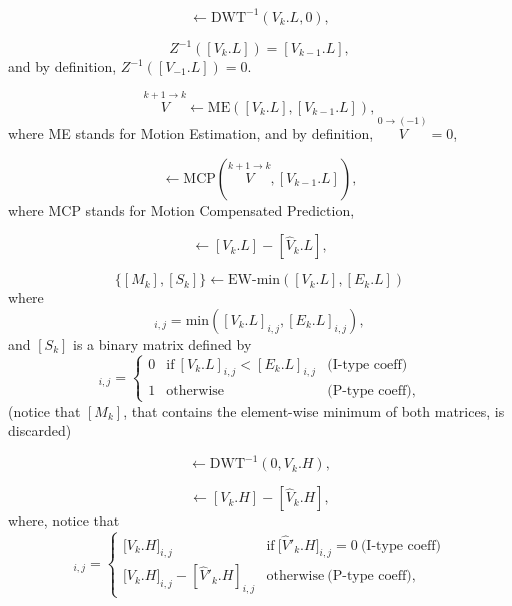 \begin{equation}
  [V_k.L] \leftarrow \text{DWT}^{-1}(V_k.L, 0),
  \tag{E.a}
\end{equation}

\begin{equation}
  Z^{-1}([V_k.L]) = [V_{k-1}.L],
  \tag{E.b}
\end{equation}
and by definition, $Z^{-1}([V_{-1}.L]) = 0$.

\begin{equation}
  \overset{k+1\rightarrow k}{V} \leftarrow \text{ME}([V_k.L], [V_{k-1}.L]),
  \tag{E.c}
\end{equation}
where ME stands for Motion Estimation, and by definition,
$\overset{0\rightarrow (-1)}{V}=0$,

\begin{equation}
  [\hat{V}_k.L] \leftarrow \text{MCP}(\overset{k+1\rightarrow k}{V}, [V_{k-1}.L]),
  \tag{E.d}
\end{equation}
where MCP stands for Motion Compensated Prediction,

\begin{equation}
  [E_k.L] \leftarrow [V_k.L] - [\hat{V}_k.L],
  \tag{E.e}
\end{equation}

\begin{equation}
  \{[M_k],[S_k]\} \leftarrow \text{EW-min}([V_k.L], [E_k.L])
  \tag{E.f}
\end{equation}
where
\begin{equation}
  [M_k]_{i,j}=\text{min}([V_k.L]_{i,j}, [E_k.L]_{i,j}),
\end{equation}
and $[S_k]$ is a binary matrix defined by
\begin{equation}
  [S_k]_{i,j} = \left\{
  \begin{array}{lll}
    0 & \text{if}~[V_k.L]_{i,j} < [E_k.L]_{i,j} & \text{(I-type coeff)} \\
    1 & \text{otherwise}                      & \text{(P-type coeff)},
  \end{array}
  \right.
  \label{eq:matrix}
\end{equation}
(notice that $[M_k]$, that contains the element-wise minimum of both
matrices, is discarded)

\begin{equation}
  [V_k.H] \leftarrow \text{DWT}^{-1}(0, V_k.H),
  \tag{b}
\end{equation}

\begin{equation}
  [E_k.H] \leftarrow [V_k.H] - [\hat{V}_k.H],
  \tag{c}
\end{equation}
where, notice that
\begin{equation}
  [E_k.H]_{i,j} = \left\{
  \begin{array}{ll}
    {[}V_k.H{]}_{i,j}                       & \text{if}~{[}\hat{V}'_k.H{]}_{i,j} = 0~\text{(I-type coeff)} \\
    {[}V_k.H{]}_{i,j} - [\hat{V}'_k.H]_{i,j} & \text{otherwise}~\text{(P-type coeff)},
  \end{array}
\right.
\end{equation}

